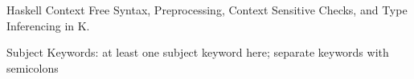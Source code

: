 Haskell Context Free Syntax, Preprocessing, Context Sensitive Checks, and Type Inferencing in K.

Subject Keywords: at least one subject keyword here; separate keywords with semicolons 
